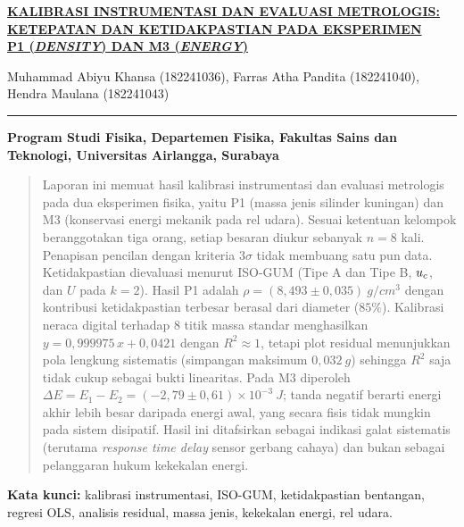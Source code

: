 \begin{center}
    \underline{\textbf{KALIBRASI INSTRUMENTASI DAN EVALUASI METROLOGIS:}} \\
    \underline{\textbf{KETEPATAN DAN KETIDAKPASTIAN PADA EKSPERIMEN}} \\
    \underline{\textbf{P1 (\textit{DENSITY}) DAN M3 (\textit{ENERGY})}}
\end{center}

\begin{center}
    Muhammad Abiyu Khansa (182241036), Farras Atha Pandita (182241040), Hendra Maulana (182241043)
\end{center}

\hrule height 2pt

\begin{center}
    \textbf{Program Studi Fisika, Departemen Fisika, Fakultas Sains dan Teknologi, Universitas Airlangga, Surabaya}
\end{center}

\vspace{10pt}
\renewcommand{\abstractname}{\normalsize{ABSTRAK}}
\begin{abstract}
\noindent
Laporan ini memuat hasil kalibrasi instrumentasi dan evaluasi metrologis pada dua eksperimen fisika, yaitu P1 (massa jenis silinder kuningan) dan M3 (konservasi energi mekanik pada rel udara). Sesuai ketentuan kelompok beranggotakan tiga orang, setiap besaran diukur sebanyak $n=8$ kali. Penapisan pencilan dengan kriteria $3\sigma$ tidak membuang satu pun data. Ketidakpastian dievaluasi menurut ISO-GUM (Tipe A dan Tipe B, $\uc$, dan $U$ pada $k=2$). Hasil P1 adalah $\rho=(8{,}493\pm0{,}035)\ \si{g/cm^3}$ dengan kontribusi ketidakpastian terbesar berasal dari diameter ($85\%$). Kalibrasi neraca digital terhadap $8$ titik massa standar menghasilkan $y=0{,}999975\,x+0{,}0421$ dengan $R^2\approx 1$, tetapi plot residual menunjukkan pola lengkung sistematis (simpangan maksimum $0{,}032\ \si{g}$) sehingga $R^2$ saja tidak cukup sebagai bukti linearitas. Pada M3 diperoleh $\Delta E=E_1-E_2=(-2{,}79\pm0{,}61)\times10^{-3}\ \si{J}$; tanda negatif berarti energi akhir lebih besar daripada energi awal, yang secara fisis tidak mungkin pada sistem disipatif. Hasil ini ditafsirkan sebagai indikasi galat sistematis (terutama \textit{response time delay} sensor gerbang cahaya) dan bukan sebagai pelanggaran hukum kekekalan energi.
\end{abstract}

\vspace{5pt}
\noindent\textbf{Kata kunci:} kalibrasi instrumentasi, ISO-GUM, ketidakpastian bentangan, regresi OLS, analisis residual, massa jenis, kekekalan energi, rel udara.
